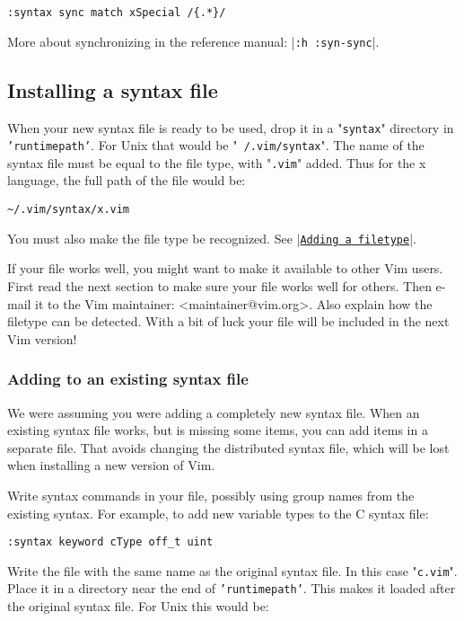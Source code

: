 \begin{Verbatim}[samepage=true]
 :syntax sync match xSpecial /{.*}/
\end{Verbatim}

More about synchronizing in the reference manual: |\texttt{:h :syn-sync}|.
\subsection{Installing a syntax file}
When your new syntax file is ready to be used, drop it in a "\texttt{syntax}" directory in \texttt{'runtimepath'}.
For Unix that would be "\texttt{~/.vim/syntax}".
The name of the syntax file must be equal to the file type, with "\texttt{.vim}" added.
Thus for the x language, the full path of the file would be:

\begin{Verbatim}[samepage=true]
    ~/.vim/syntax/x.vim 
\end{Verbatim}

You must also make the file type be recognized.
See |\hyperref[Adding a filetype]{\texttt{Adding a filetype}}|.

If your file works well, you might want to make it available to other Vim users.
First read the next section to make sure your file works well for others. Then e-mail it to the Vim maintainer: <maintainer@vim.org>. Also explain how the filetype can be detected.
With a bit of luck your file will be included in the next Vim version!

\subsubsection{Adding to an existing syntax file}
We were assuming you were adding a completely new syntax file.
When an existing syntax file works, but is missing some items, you can add items in a separate file.
That avoids changing the distributed syntax file, which will be lost when installing a new version of Vim.

Write syntax commands in your file, possibly using group names from the existing syntax.
For example, to add new variable types to the C syntax file:

\begin{Verbatim}[samepage=true]
 :syntax keyword cType off_t uint
\end{Verbatim}

Write the file with the same name as the original syntax file.
In this case "\texttt{c.vim}".
Place it in a directory near the end of \texttt{'runtimepath'}.
This makes it loaded after the original syntax file.
For Unix this would be:

